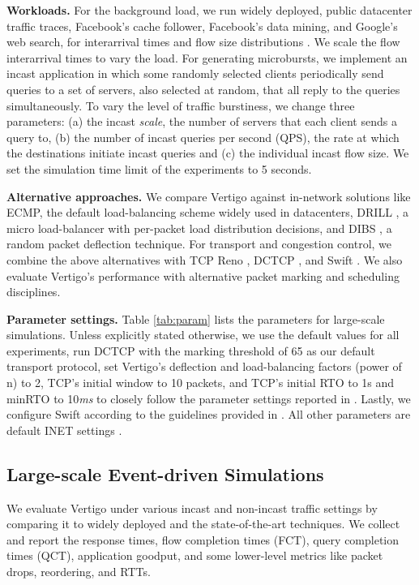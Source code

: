 \textbf{Workloads.} For the background load, we run widely deployed, public datacenter traffic traces, \ie Facebook's cache follower, Facebook's data mining, and Google's web search, for interarrival times and flow size distributions \cite{social, dctcp}. We scale the flow interarrival times to vary the load. For generating microbursts, we implement an incast application in which some randomly selected clients periodically send queries to a set of servers, also selected at random, that all reply to the queries simultaneously. To vary the level of traffic burstiness, we change three parameters: (a) the incast \emph{scale}, \ie the number of servers that each client sends a query to, (b) the number of incast queries per second (QPS), \ie the rate at which the destinations initiate incast queries and (c) the individual incast flow size. We set the simulation time limit of the experiments to 5 seconds.

\textbf{Alternative approaches.} We compare Vertigo against in-network solutions like ECMP, the default load-balancing scheme widely used in datacenters, DRILL \cite{drill}, a micro load-balancer with per-packet load distribution decisions, and DIBS \cite{dibs}, a random packet deflection technique. For transport and congestion control, we combine the above alternatives with TCP Reno \cite{newreno}, DCTCP \cite{dctcp}, and Swift \cite{swift}. We also evaluate Vertigo's performance with alternative packet marking and scheduling disciplines. 

\textbf{Parameter settings.} Table \ref{tab:param} lists the parameters for large-scale simulations. Unless explicitly stated otherwise, we use the default values for all experiments, run DCTCP with the marking threshold of 65 as our default transport protocol, set Vertigo's deflection and load-balancing factors (power of n) to 2, TCP's initial window to 10 packets, and TCP's initial RTO to 1s and minRTO to 10\emph{ms} to closely follow the parameter settings reported in \cite{dctcp, dibs}. Lastly, we configure Swift according to the guidelines provided in \cite{swift}. All other parameters are default INET settings \cite{inet}. 

\subsection{Large-scale Event-driven Simulations}
\label{sec:large}
We evaluate Vertigo under various incast and non-incast traffic settings by comparing it to widely deployed and the state-of-the-art techniques. We collect and report the response times, flow completion times (FCT), query completion times (QCT), application goodput, and some lower-level metrics like packet drops, reordering, and RTTs.



